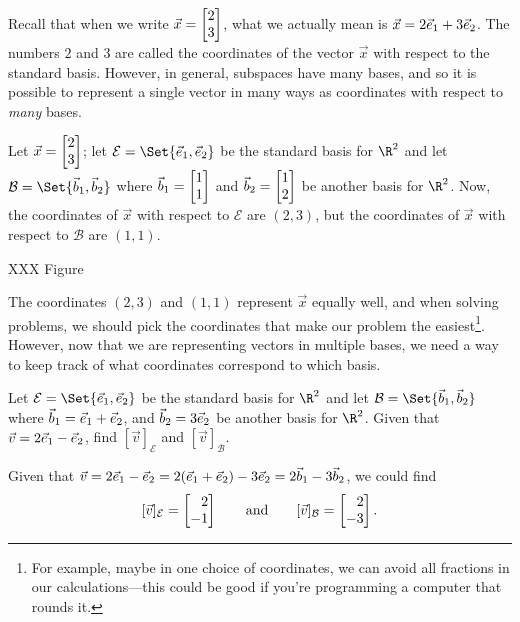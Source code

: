 
Recall that when we write $\vec x=\mat{2\\3}$, what we actually mean is $\vec x=2{\vec e_1}+3{\vec e_2}$. The numbers $2$
and $3$ are called the coordinates of the vector $\vec x$ with respect to the standard basis.  However, in general,
subspaces have many bases, and so it is possible to represent a single vector in many ways as coordinates with
respect to \emph{many} bases.

Let $\vec x=\mat{2\\3}$; let $\mathcal E=\Set{\xhat,\yhat}$ be the standard basis for $\R^2$ and let
$\mathcal B=\Set{\vec b_1,\vec b_2}$ where $\vec b_1=\mat{1\\1}$ and $\vec b_2=\mat{1\\2}$ be another
basis for $\R^2$. Now, the coordinates of $\vec x$ with respect to $\mathcal E$ are $(2,3)$, but
the coordinates of $\vec x$ with respect to $\mathcal B$ are $(1,1)$.

XXX Figure

The coordinates $(2,3)$ and $(1,1)$ represent $\vec x$ equally well, and when solving problems, we should pick the
coordinates that make our problem the easiest\footnote{ For example, maybe in one choice of coordinates, we can avoid all 
fractions in our calculations---this could be good if you're programming a computer that rounds it.}. However, now that we
are representing vectors in multiple bases, we need a way to keep track of what coordinates correspond to which basis.


\begin{example}
	Let $\mathcal E=\Set{\xhat,\yhat}$ be the standard basis for $\R^2$ and let $\mathcal B=\Set{\vec b_1,\vec b_2}$
	where $\vec b_1={\vec e_1}+{\vec e_2}$, and $\vec b_2 =3{\vec e_2}$ be another basis for $\R^2$. Given that $\vec v=2{\vec e_1}-{\vec e_2}$, 
	find $[\vec v]_{\mathcal E}$ and $[\vec v]_{\mathcal B}$.

	Given that $\vec v=2{\vec e_1}-{\vec e_2}=2({\vec e_1}+{\vec e_2})-3{\vec e_2}=2\vec b_1-3\vec b_2$, we could find 
	\[
	    [\vec v]_{\mathcal E}=\mat{2\\-1}\qquad\text{and}\qquad[\vec v]_{\mathcal B}=\mat{2\\-3}.
	\]
\end{example}

